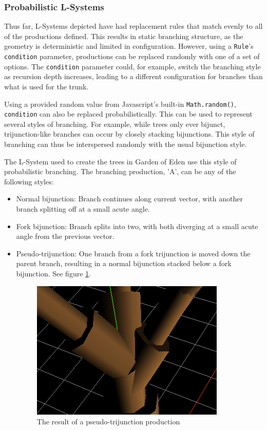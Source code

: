 \documentclass{article}
\newcommand{\tab}{\hspace*{2em}}
\begin{document}
            \subsubsection{Probabilistic L-Systems}
    \tab Thus far, L-Systems depicted have had replacement rules that match evenly to all of the
productions defined. This results in static branching structure, as the geometry is deterministic
and limited in configuration. However, using a \verb|Rule|'s \verb|condition| parameter,
productions can be replaced randomly with one of a set of options. The \verb|condition| parameter
could, for example, switch the branching style as recursion depth increases, leading to a different
configuration for branches than what is used for the trunk.

    \tab Using a provided random value from Javascript's built-in \verb|Math.random()|,
\verb|condition| can also be replaced probabilistically. This can be used to represent several
styles of branching. For example, while trees only ever bijunct, trijunction-like branches can
occur by closely stacking bijunctions. This style of branching can thus be interspersed randomly
with the usual bijunction style.

    \tab The L-System used to create the trees in Garden of Eden use this style of probabilistic
branching. The branching production, 'A', can be any of the following styles:
    \begin{itemize}
        \item Normal bijunction: Branch continues along current vector, with another branch
splitting off at a small acute angle.
        \item Fork bijunction: Branch splits into two, with both diverging at a small acute angle
from the previous vector.
        \item Pseudo-trijunction: One branch from a fork trijunction is moved down the parent
branch, resulting in a normal bijunction stacked below a fork bijunction. See figure
\ref{fig:fig/pseudotri}.
        \begin{figure}[h]
            \centering
            \includegraphics{fig/pseudotri}
            \caption[Pseudo-Trijunction]{The result of a pseudo-trijunction production}
            \label{fig:fig/pseudotri}

        \end{figure}
    \end{itemize}
\end{document}
